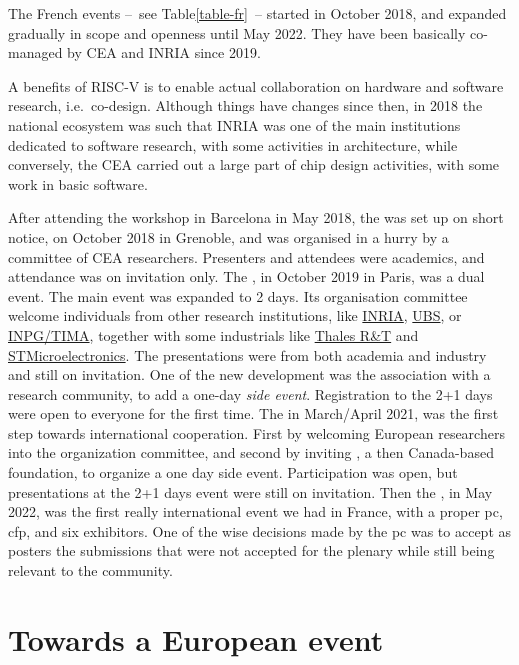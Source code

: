 \documentclass[
	a4paper, %
	10pt, %
	unnumberedsections, %
	twoside, %
]{LTJournalArticle}
\begin{document}
The French events --~see Table\;\ref{table-fr}~--
started in October 2018, and expanded gradually in scope and openness
until May 2022. They have been basically co-managed by CEA and INRIA
since 2019.

A benefits of RISC-V is to enable actual collaboration on hardware and
software research, i.e.\ co-design.  Although things have changes since
then, in 2018 the national ecosystem was such that INRIA was one of
the main institutions dedicated to software research, with some
activities in \textmu architecture, while conversely, the CEA carried
out a large part of chip design activities, with some work in basic
software.

After attending the workshop in Barcelona in May 2018, the
 \cite{MTG-1} was set up on short notice, on October
2018 in Grenoble, and was organised in a hurry by a committee of CEA
researchers.  Presenters and attendees were academics, and attendance
was on invitation only.  The  \cite{WEEK-1}, in
October 2019 in Paris, was a dual event. The main event was expanded
to 2 days. Its organisation committee welcome individuals from other
research institutions, like \href{https://inria.fr}{INRIA},
\href{https://www.univ-ubs.fr/fr/index.html}{UBS}, or
\href{https://tima.univ-grenoble-alpes.fr}{INPG/TIMA}, together with
some industrials like
\href{https://www.thalesgroup.com/en/research-and-innovation}{Thales
  R\&T} and
\href{https://www.st.com/content/st_com/en.html}{STMicroelectronics}. The
presentations were from both academia and industry and still on
invitation. One of the new development was the association with a
research community,  \cite{GDR-SOC2} to add a
one-day \emph{side event}. Registration to the 2+1 days were open to
everyone for the first time. The  in March/April
2021, was the first step towards international cooperation. First by
welcoming European researchers into the organization committee, and
second by inviting , a then Canada-based foundation,
to organize a one day side event. Participation was open, but
presentations at the 2+1 days event were still on invitation. Then the
 \cite{WEEK-3}, in May 2022, was the first really
international event we had in France, with a proper \gls{pc},
\gls{cfp}, and six exhibitors. One of the wise decisions made by the
\gls{pc} was to accept as posters the submissions that were not
accepted for the plenary while still being relevant to the community.

\section{Towards a European event}
\end{document}
